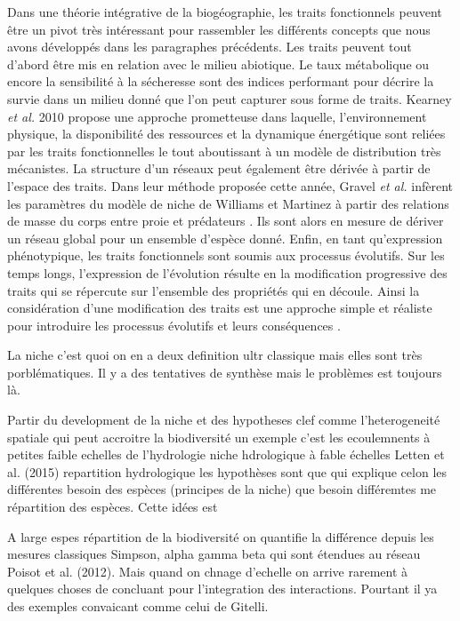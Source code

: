 Dans une théorie intégrative de la biogéographie, les traits
fonctionnels peuvent être un pivot très intéressant pour rassembler les
différents concepts que nous avons développés dans les paragraphes
précédents. Les traits peuvent tout d'abord être mis en relation avec le
milieu abiotique. Le taux métabolique ou encore la sensibilité à la
sécheresse sont des indices performant pour décrire la survie dans un
milieu donné \cite{Kearney2004,Engelbrecht2007} que l'on peut capturer
sous forme de traits. Kearney \textit{et al.} 2010 propose une approche
prometteuse dans laquelle, l'environnement physique, la disponibilité
des ressources et la dynamique énergétique sont reliées par les traits
fonctionnelles le tout aboutissant à un modèle de distribution très
mécanistes. La structure d'un réseaux peut également être dérivée à
partir de l'espace des traits. Dans leur méthode proposée cette année,
Gravel \textit{et al.} infèrent les paramètres du modèle de niche de
Williams et Martinez \cite{Williams2000} à partir des relations de masse
du corps entre proie et prédateurs \cite{Gravel2013}. Ils sont alors en
mesure de dériver un réseau global pour un ensemble d'espèce donné.
Enfin, en tant qu'expression phénotypique, les traits fonctionnels sont
soumis aux processus évolutifs. Sur les temps longs, l'expression de
l'évolution résulte en la modification progressive des traits qui se
répercute sur l'ensemble des propriétés qui en découle. Ainsi la
considération d'une modification des traits est une approche simple et
réaliste pour introduire les processus évolutifs et leurs conséquences
\cite{Guill2008,Loeuille2005}.

La niche c'est quoi on en a deux definition ultr classique mais elles
sont très porblématiques. Il y a des tentatives de synthèse mais le
problèmes est toujours là.

Partir du development de la niche et des hypotheses clef comme
l'heterogeneité spatiale qui peut accroitre la biodiversité un exemple
c'est les ecoulemnents à petites faible echelles de l'hydrologie niche
hdrologique à fable échelles Letten et al. (2015) repartition
hydrologique les hypothèses sont que qui explique celon les différentes
besoin des espèces (principes de la niche) que besoin différemtes me
répartition des espèces. Cette idées est

A large espes répartition de la biodiversité on quantifie la différence
depuis les mesures classiques Simpson, alpha gamma beta qui sont
étendues au réseau Poisot et al. (2012). Mais quand on chnage d'echelle
on arrive rarement à quelques choses de concluant pour l'integration des
interactions. Pourtant il ya des exemples convaicant comme celui de
Gitelli.

